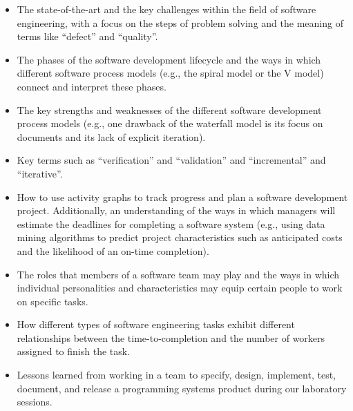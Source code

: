 \vspace*{-.05in}
\begin{itemize}

  \itemsep 0in

  \item The state-of-the-art and the key challenges within the field of software engineering, with a focus on the steps
    of problem solving and the meaning of terms like ``defect'' and ``quality''.

  \item The phases of the software development lifecycle and the ways in which different software process models (e.g.,
    the spiral model or the V model) connect and interpret these phases.

  \item The key strengths and weaknesses of the different software development process models (e.g., one drawback of
    the waterfall model is its focus on documents and its lack of explicit iteration).

  \item Key terms such as ``verification'' and ``validation'' and ``incremental'' and ``iterative''.

  \item How to use activity graphs to track progress and plan a software development project. Additionally, an
    understanding of the ways in which managers will estimate the deadlines for completing a software system (e.g.,
    using data mining algorithms to predict project characteristics such as anticipated costs and the likelihood of an
    on-time completion).

  \item The roles that members of a software team may play and the ways in which individual personalities
    and characteristics may equip certain people to work on specific tasks.

  \item How different types of software engineering tasks exhibit different relationships between the time-to-completion
    and the number of workers assigned to finish the task.

  \item Lessons learned from working in a team to specify, design, implement, test, document, and release a programming
    systems product during our laboratory sessions.

\end{itemize}

